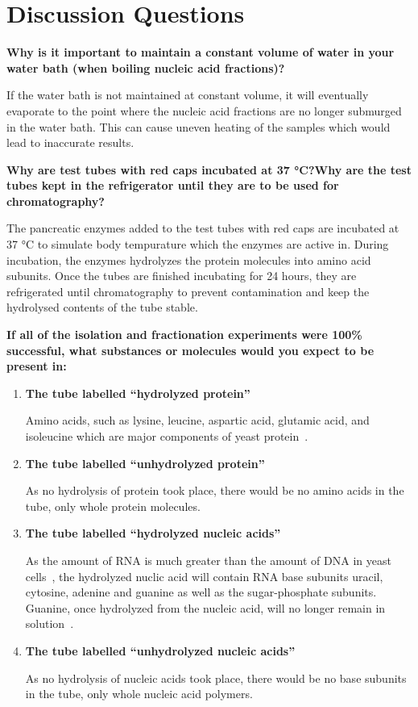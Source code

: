 \section*{Discussion Questions}

\textbf{Why is it important to maintain a constant volume of water in your water bath (when boiling nucleic acid fractions)?}\par \medskip
If the water bath is not maintained at constant volume, it will eventually evaporate to the point where the nucleic acid fractions are no longer submurged in the water bath. This can cause uneven heating of the samples which would lead to inaccurate results.
\par \bigskip \noindent
\textbf{Why are test tubes with red caps incubated at 37 °C?\@ Why are the test tubes kept in the refrigerator until they are to be used for chromatography?}\par \medskip
The pancreatic enzymes added to the test tubes with red caps are incubated at 37 °C to simulate body tempurature which the enzymes are active in. During incubation, the enzymes hydrolyzes the protein molecules into amino acid subunits. Once the tubes are finished incubating for 24 hours, they are refrigerated until chromatography to prevent contamination and keep the hydrolysed contents of the tube stable.
\par \bigskip \noindent
\textbf{If all of the isolation and fractionation experiments were 100\% successful, what substances or molecules would you expect to be present in:}
    \begin{enumerate}[label = (\alph*)]
        \item \textbf{The tube labelled ``hydrolyzed protein''}\par Amino acids, such as lysine, leucine, aspartic acid, glutamic acid, and isoleucine which are major components of yeast protein~\citep{ABDELHAFEZ1977631}.
        \item \textbf{The tube labelled ``unhydrolyzed protein''}\par As no hydrolysis of protein took place, there would be no amino acids in the tube, only whole protein molecules.
        \item \textbf{The tube labelled ``hydrolyzed nucleic acids''}\par As the amount of RNA is much greater than the amount of DNA in yeast cells~\citep{OLM2023}, the hydrolyzed nuclic acid will contain RNA base subunits uracil, cytosine, adenine and guanine as well as the sugar-phosphate subunits. Guanine, once hydrolyzed from the nucleic acid, will no longer remain in solution~\citep{OLM2023}.
        \item \textbf{The tube labelled ``unhydrolyzed nucleic acids''}\par As no hydrolysis of nucleic acids took place, there would be no base subunits in the tube, only whole nucleic acid polymers.
    \end{enumerate}
